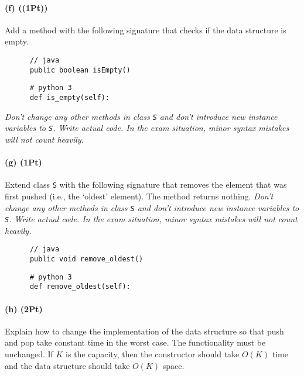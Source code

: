 \documentclass{tufte-handout}
\begin{document}
      \paragraph*{(f) ((1Pt))}
     Add a method with the following signature that checks if the data structure is empty.

      \begin{minipage}{6cm}
      \begin{verbatim}
      // java
      public boolean isEmpty()
      \end{verbatim}
      \end{minipage}
%
      \begin{minipage}{6cm}
      \begin{verbatim}
      # python 3
      def is_empty(self):
      \end{verbatim}
      \end{minipage}

      \emph{Don't change any other methods in class {\tt S} and don't introduce new instance variables to {\tt S}.
        Write actual code.
        In the exam situation, minor syntax mistakes will not count heavily.}
     
      \paragraph*{(g) (1Pt)}
      Extend class {\tt S} with the following signature that removes the element that was first pushed (i.e., the `oldest' element).
      The method returns nothing.
      \emph{Don't change any other methods in class {\tt S} and don't introduce new instance variables to {\tt S}.
        Write actual code.
        In the exam situation, minor syntax mistakes will not count heavily.}

    \medskip
      \begin{minipage}{6cm}
      \begin{verbatim}
      // java
      public void remove_oldest()
      \end{verbatim}
      \end{minipage}
%
      \begin{minipage}{6cm}
      \begin{verbatim}
      # python 3
      def remove_oldest(self):
      \end{verbatim}
      \end{minipage}

      \paragraph*{(h) (2Pt)}
      Explain how to change the implementation of the data structure so that push and pop take constant time in the worst case.
      The functionality must be unchanged.
      If $K$ is the capacity, then the constructor should take $O(K)$ time and the data structure should take $O(K)$ space.
\end{document}
